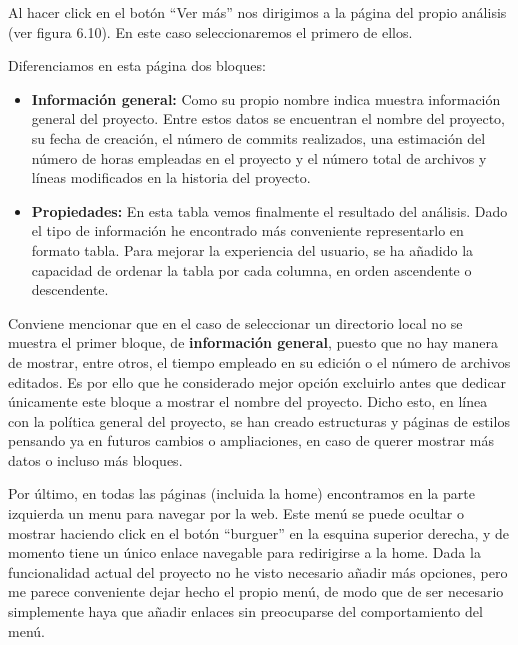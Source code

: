 \documentclass[a4paper, 12pt]{book}
\begin{document}
Al hacer click en el botón ``Ver más'' nos dirigimos a la página del propio análisis (ver figura 6.10). En este caso seleccionaremos el primero de ellos.

Diferenciamos en esta página dos bloques:

\begin{itemize}
    \item \textbf{Información general: } Como su propio nombre indica muestra información general del proyecto. Entre estos datos se encuentran el nombre del proyecto, su fecha de creación, el número de commits realizados, una estimación del número de horas empleadas en el proyecto y el número total de archivos y líneas modificados en la historia del proyecto.

    \item \textbf{Propiedades: } En esta tabla vemos finalmente el resultado del análisis. Dado el tipo de información he encontrado más conveniente representarlo en formato tabla. Para mejorar la experiencia del usuario, se ha añadido la capacidad de ordenar la tabla por cada columna, en orden ascendente o descendente.
\end{itemize}

Conviene mencionar que en el caso de seleccionar un directorio local no se muestra el primer bloque, de \textbf{información general}, puesto que no hay manera de mostrar, entre otros, el tiempo empleado en su edición o el número de archivos editados. Es por ello que he considerado mejor opción excluirlo antes que dedicar únicamente este bloque a mostrar el nombre del proyecto. Dicho esto, en línea con la política general del proyecto, se han creado estructuras y páginas de estilos pensando ya en futuros cambios o ampliaciones, en caso de querer mostrar más datos o incluso más bloques.

Por último, en todas las páginas (incluida la home) encontramos en la parte izquierda un menu para navegar por la web. Este menú se puede ocultar o mostrar haciendo click en el botón ``burguer'' en la esquina superior derecha, y de momento tiene un único enlace navegable para redirigirse a la home. Dada la funcionalidad actual del proyecto no he visto necesario añadir más opciones, pero me parece conveniente dejar hecho el propio menú, de modo que de ser necesario simplemente haya que añadir enlaces sin preocuparse del comportamiento del menú.
\end{document}

